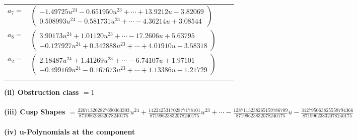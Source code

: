 \documentclass[1p]{elsarticle_modified}
\theoremstyle{definition}
\begin{document}
\begin{tabular}{m{7pt} m{180pt} m{7pt} m{180pt} }
\flushright $a_{7}=$&$\begin{pmatrix}-1.49725 u^{24}-0.651950 u^{23}+\cdots+13.9212 u-3.82069\\0.508993 u^{24}-0.581731 u^{23}+\cdots-4.36214 u+3.08544\end{pmatrix}$ \\
\flushright $a_{8}=$&$\begin{pmatrix}3.90173 u^{24}+1.01120 u^{23}+\cdots-17.2606 u+5.63795\\-0.127927 u^{24}+0.342888 u^{23}+\cdots+4.01910 u-3.58318\end{pmatrix}$ \\
\flushright $a_{2}=$&$\begin{pmatrix}2.18487 u^{24}+1.41269 u^{23}+\cdots-6.74107 u+1.97101\\-0.499169 u^{24}-0.167673 u^{23}+\cdots+1.13386 u-1.21729\end{pmatrix}$\\&\end{tabular}
\flushleft \textbf{(ii) Obstruction class $= 1$}\\~\\
\flushleft \textbf{(iii) Cusp Shapes $= \frac{226713202827690363303}{87199623832078240175} u^{24}+\frac{142242531702877178101}{87199623832078240175} u^{23}+\cdots-\frac{1287113238265159786709}{87199623832078240175} u-\frac{312795063825558794366}{87199623832078240175}$}\\~\\
\newpage\renewcommand{\arraystretch}{1}
\flushleft \textbf{(iv) u-Polynomials at the component}\newline \\
\end{document}
